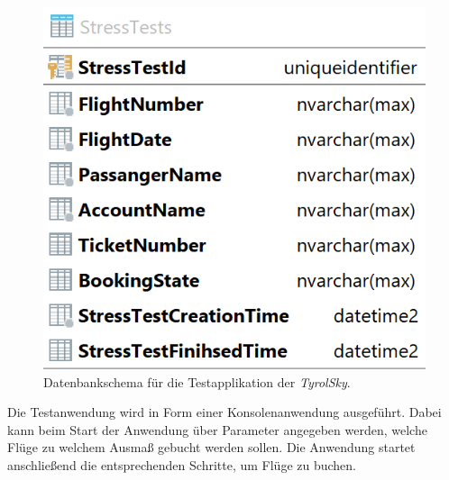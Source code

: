 % 
\begin{figure}
    \centering
    \includegraphics[width=0.4\linewidth]{gfx/implementation/stressTestDbSchema}
    \caption{Datenbankschema für die Testapplikation der \textit{TyrolSky}.}
    \label{fig:implementation:stressTestDbSchema}
\end{figure} 

Die Testanwendung wird in Form einer Konsolenanwendung ausgeführt. Dabei kann beim Start der Anwendung über Parameter angegeben werden, welche Flüge zu welchem Ausmaß gebucht werden sollen. Die Anwendung startet anschließend die entsprechenden Schritte, um Flüge zu buchen. 

